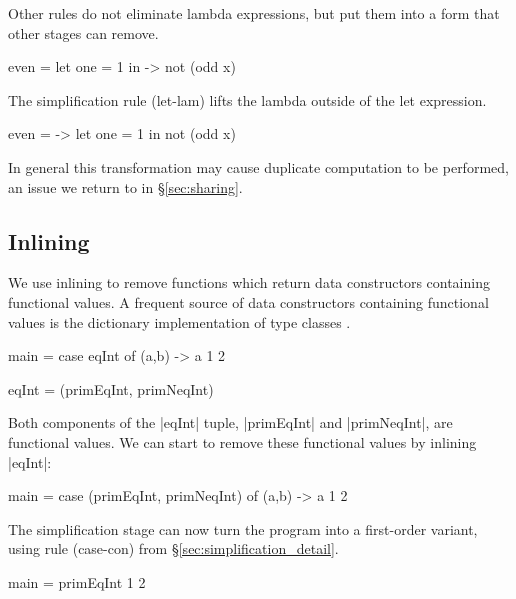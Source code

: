 \documentclass[preprint]{sigplanconf}
\begin{document}
\noindent Other rules do not eliminate lambda expressions, but put them into a form that other stages can remove.

\begin{example}
\begin{code}
even =  let  one = 1
        in   \x -> not (odd x)
\end{code}

\noindent The simplification rule (let-lam) lifts the lambda outside of the let expression.

\begin{code}
even = \x ->  let  one = 1
              in   not (odd x)
\end{code}

\noindent In general this transformation may cause duplicate computation to be performed, an issue we return to in \S\ref{sec:sharing}.
\end{example}


\subsection{Inlining}

We use inlining to remove functions which return data constructors containing functional values. A frequent source of data constructors containing functional values is the dictionary implementation of type classes \cite{wadler:type_classes}.

\begin{example}
\begin{code}
main = case  eqInt of
             (a,b) -> a 1 2

eqInt = (primEqInt, primNeqInt)
\end{code}

Both components of the |eqInt| tuple, |primEqInt| and |primNeqInt|, are functional values. We can start to remove these functional values by inlining |eqInt|:

\begin{code}
main = case  (primEqInt, primNeqInt) of
             (a,b) -> a 1 2
\end{code}

\noindent The simplification stage can now turn the program into a first-order variant, using rule (case-con) from \S\ref{sec:simplification_detail}.

\begin{code}
main = primEqInt 1 2
\end{code}\codeexample
\end{example}
\end{document}
